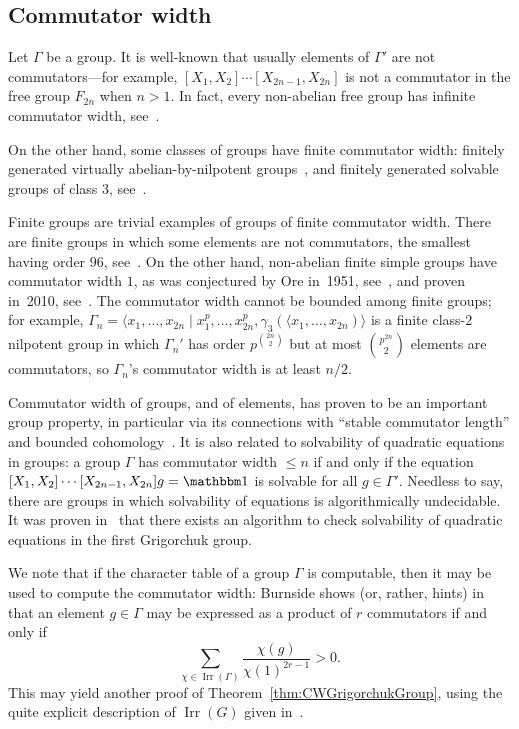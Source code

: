 \documentclass[a4paper,11pt]{amsart}
\begin{document}
\subsection{Commutator width}
Let $\Gamma$ be a group. It is well-known that usually elements of
$\Gamma'$ are not commutators---for example,
$[X_1,X_2]\cdots[X_{2n-1},X_{2n}]$ is not a commutator in the free
group $F_{2n}$ when $n>1$. In fact, every non-abelian free group has
infinite commutator width, see~\cite{Rhemtulla:CommutatorsF2}.

On the other hand, some classes of groups have finite commutator
width: finitely generated virtually abelian-by-nilpotent
groups~\cite{Segal:Words}, and finitely generated solvable groups of
class $3$, see~\cite{Rhemtulla:Commutators}.

Finite groups are trivial examples of groups of finite commutator
width.  There are finite groups in which some elements are not
commutators, the smallest having order $96$,
see~\cite{Guralnick:Group96}. On the other hand, non-abelian finite
simple groups have commutator width $1$, as was conjectured by Ore
in~1951, see~\cite{Ore:Commutators}, and proven in~2010,
see~\cite{Liebeck:OreConjecture}. The commutator width cannot be
bounded among finite groups; for example,
$\Gamma_n=\langle x_1,\dots,x_{2n}\mid
x_1^p,\dots,x_{2n}^p,\gamma_3(\langle x_1,\dots,x_{2n})\rangle$ is a
finite class-$2$ nilpotent group in which $\Gamma_n'$ has order
$p^{\binom{2n}2}$ but at most $\binom{p^{2n}}2$ elements are
commutators, so $\Gamma_n$'s commutator width is at least $n/2$.

Commutator width of groups, and of elements, has proven to be an
important group property, in particular via its connections with
``stable commutator length'' and bounded
cohomology~\cite{Calegari:SCL}. It is also related to solvability of
quadratic equations in groups: a group $\Gamma$ has commutator width
$\le n$ if and only if the equation
$[X_1,X_2]\cdots[X_{2n-1},X_{2n}]g=\id$ is solvable for all
$g\in\Gamma'$. Needless to say, there are groups in which solvability
of equations is algorithmically undecidable. It was proven
in~\cite{Lysenok-Miasnikov-Ushakov:QuadraticEquationsInGrig} that 
there exists an algorithm to check solvability of quadratic equations  in the first Grigorchuk group.

We note that if the character table of a group $\Gamma$ is computable,
then it may be used to compute the commutator width: Burnside shows
(or, rather, hints) in~\cite[\S238, Ex. 7]{Burnside:Groups} that an
element $g\in\Gamma$ may be expressed as a product of $r$ commutators
if and only if
\[\sum_{\chi\in\operatorname{Irr}(\Gamma)}\frac{\chi(g)}{\chi(1)^{2r-1}}>0.\]
This may yield another proof of Theorem~\ref{thm:CWGrigorchukGroup},
using the quite explicit description of $\operatorname{Irr}(G)$ given
in~\cite{Bartholdi:RepresentationZetaFunctions}.
\end{document}
